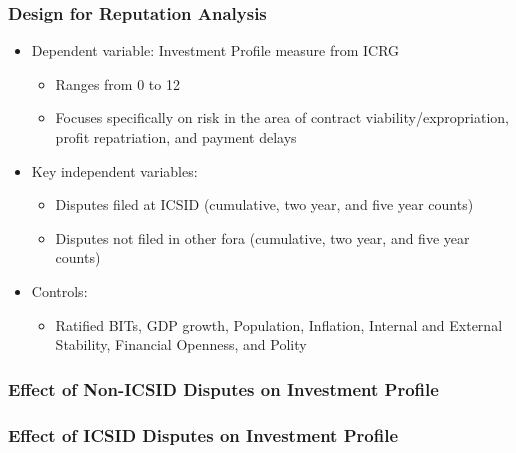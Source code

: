 \documentclass[10pt]{beamer}
\begin{document}
\begin{frame}
\frametitle{Design for Reputation Analysis}

\begin{itemize}
\item Dependent variable: Investment Profile measure from ICRG
\begin{itemize}
\item Ranges from 0 to 12
\item Focuses specifically on risk in the area of contract viability/expropriation, profit repatriation, and payment delays
\end{itemize}
\item Key independent variables: 
\begin{itemize}
\item Disputes filed at ICSID (cumulative, two year, and five year counts)
\item Disputes not filed in other fora (cumulative, two year, and five year counts)
\end{itemize}
\item Controls:
\begin{itemize}
\item Ratified BITs, GDP growth, Population, Inflation, Internal and External Stability, Financial Openness, and Polity
\end{itemize}
\end{itemize}

\end{frame}

\begin{frame}
\frametitle{Effect of Non-ICSID Disputes on Investment Profile}

\begin{figure}[ht]
	\centering
	\vspace{-5mm}	
	\resizebox{1\textwidth}{!}{}	
\end{figure}

\end{frame}

\begin{frame}
\frametitle{Effect of ICSID Disputes on Investment Profile}

\begin{figure}[ht]
	\centering
	\vspace{-5mm}	
	\resizebox{1\textwidth}{!}{}
\end{figure}

\end{frame}
\end{document}
